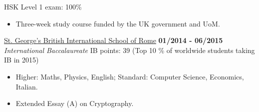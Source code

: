 \documentclass[]{friggeri-cv}
\begin{document}
\begin{entrylist}
    {HSK Level 1 exam: 100\%}
    \begin{itemize}
        \item Three-week study course funded by the UK government and UoM.
    \end{itemize}
  \entry
    {}
    {\href{http://www.stgeorge.school.it/}{St. George's British International School of Rome}}
    {\textbf{01/2014 - 06/2015}}
    {\emph{International Baccalaureate}}
    {IB points: 39  (Top 10 \% of worldwide students taking IB in 2015)}
    \begin{itemize}
        \item Higher: Maths, Physics, English; Standard: Computer Science, Economics, Italian.
        \item Extended Essay (A) on Cryptography.
    \end{itemize}
\end{entrylist}
\end{document}
